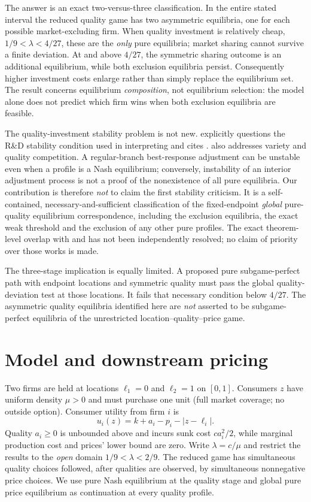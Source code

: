 \documentclass[11pt]{article}
\begin{document}
The answer is an exact two-versus-three classification. In the entire stated interval the reduced quality game has two asymmetric equilibria, one for each possible market-excluding firm. When quality investment is relatively cheap, $1/9<\lambda<4/27$, these are the \emph{only} pure equilibria; market sharing cannot survive a finite deviation. At and above $4/27$, the symmetric sharing outcome is an additional equilibrium, while both exclusion equilibria persist. Consequently higher investment costs enlarge rather than simply replace the equilibrium set. The result concerns equilibrium \emph{composition}, not equilibrium selection: the model alone does not predict which firm wins when both exclusion equilibria are feasible.

The quality-investment stability problem is not new. \citet[chap.~3, especially pp.~92 and 104--106]{Bunte1997} explicitly questions the R\&D stability condition used in interpreting \citet{Economides1989} and cites \citet{Sorenson1995}. \citet{Bunte1995} also addresses variety and quality competition. A regular-branch best-response adjustment can be unstable even when a profile is a Nash equilibrium; conversely, instability of an interior adjustment process is not a proof of the nonexistence of all pure equilibria. Our contribution is therefore \emph{not} to claim the first stability criticism. It is a self-contained, necessary-and-sufficient classification of the fixed-endpoint \emph{global} pure-quality equilibrium correspondence, including the exclusion equilibria, the exact weak threshold and the exclusion of any other pure profiles. The exact theorem-level overlap with \citet{Bunte1995} and \citet{Sorenson1995} has not been independently resolved; no claim of priority over those works is made.

The three-stage implication is equally limited. A proposed pure subgame-perfect path with endpoint locations and symmetric quality must pass the global quality-deviation test at those locations. It fails that necessary condition below $4/27$. The asymmetric quality equilibria identified here are \emph{not} asserted to be subgame-perfect equilibria of the unrestricted location--quality--price game.

\section{Model and downstream pricing}\label{sec:model}
Two firms are held at locations $\ell_1=0$ and $\ell_2=1$ on $[0,1]$. Consumers $z$ have uniform density $\mu>0$ and must purchase one unit (full market coverage; no outside option). Consumer utility from firm $i$ is
\begin{equation}\label{eq:utility}
u_i(z)=k+a_i-p_i-|z-\ell_i|.
\end{equation}
Quality $a_i\geq0$ is unbounded above and incurs sunk cost $ca_i^2/2$, while marginal production cost and prices' lower bound are zero. Write $\lambda=c/\mu$ and restrict the results to the \emph{open} domain $1/9<\lambda<2/9$. The reduced game has simultaneous quality choices followed, after qualities are observed, by simultaneous nonnegative price choices. We use pure Nash equilibrium at the quality stage and global pure price equilibrium as continuation at every quality profile.
\end{document}
